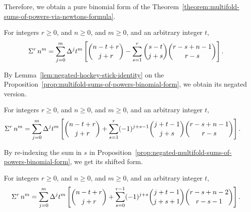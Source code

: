 Therefore, we obtain a pure binomial form
of the
Theorem~\eqref{theorem:multifold-sums-of-powers-via-newtons-formula}.

\begin{proposition}
  \label{prop:multifold-sums-of-powers-binomial-form}
  For integers $r\geq 0$, and $n\geq 0$, and $m\geq 0$,
  and an arbitrary integer $t$,
  \begin{align*}
    \Sigma^{r}\,{n}^{m}
    = \sum_{j=0}^{m} \Delta^{j} t^{m}
    \left[ \binom{n-t+r}{j+r} -
      \sum_{s=1}^{r} \binom{s-t}{j+s} \binom{r-s+n-1}{r-s}
    \right].
  \end{align*}
\end{proposition}

By Lemma~\eqref{lem:negated-hockey-stick-identity} on the
Proposition~\eqref{prop:multifold-sums-of-powers-binomial-form},
we obtain its negated version.

\begin{proposition}
  \label{prop:negated-multifold-sums-of-powers-binomial-form}
  For integers $r\geq 0$, and $n\geq 0$, and $m\geq 0$,
  and an arbitrary integer $t$,
  \begin{align*}
    \Sigma^{r}\,{n}^{m}
    &= \sum_{j=0}^{m} \Delta^{j} t^{m}
    \left[ \binom{n-t+r}{j+r} +
      \sum_{s=1}^{r} (-1)^{j+s-1} \binom{j+t-1}{j+s} \binom{r-s+n-1}{r-s}
    \right].
  \end{align*}
\end{proposition}

By re-indexing the sum in $s$ in
Proposition~\eqref{prop:negated-multifold-sums-of-powers-binomial-form},
we get its shifted form.

\begin{proposition}
  \label{prop:negated-multifold-sums-of-powers-binomial-form-reindexed}
  For integers $r\geq 0$, and $n\geq 0$, and $m\geq 0$,
  and an arbitrary integer $t$,
  \begin{align*}
    \Sigma^{r}\,{n}^{m}
    = \sum_{j=0}^{m} \Delta^{j} t^{m}
    \left[ \binom{n-t+r}{j+r} +
      \sum_{s=0}^{r-1} (-1)^{j+s} \binom{j+t-1}{j+s+1} \binom{r-s+n-2}{r-s-1}
    \right].
  \end{align*}
\end{proposition}
